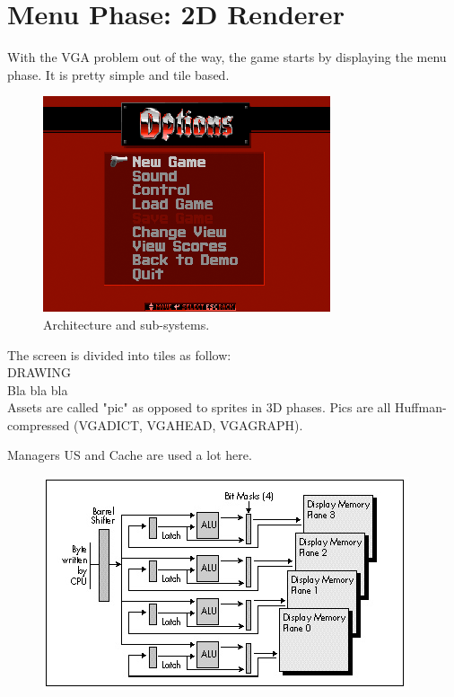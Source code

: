 \section{Menu Phase: 2D Renderer}
With the VGA problem out of the way, the game starts by displaying the menu phase. It is pretty simple and tile based.
\par
\begin{figure}[H]
\centering
\includegraphics[width=\textwidth]{screenshots/first_menu.png}
\caption{Architecture and sub-systems.}
\end{figure}
\par
 The screen is divided into tiles as follow:\\
DRAWING\\
Bla bla bla\\
Assets are called "pic" as opposed to sprites in 3D phases. Pics  are all Huffman-compressed (VGADICT, VGAHEAD, 
VGAGRAPH).
\par
Managers US and Cache are used a lot here.
 \begin{figure}[H]
\centering
 \includegraphics[width=\textwidth]{imgs/drawings/latches_drawing.png}
 \end{figure}

